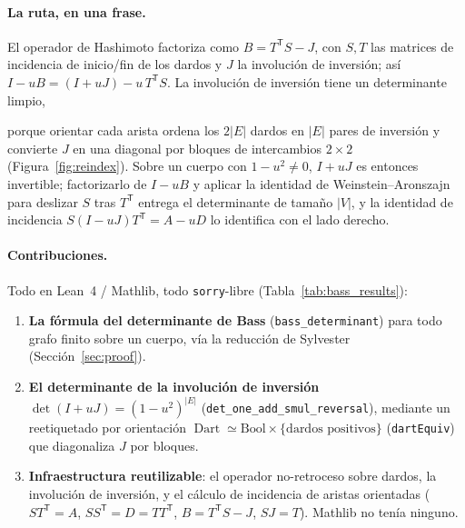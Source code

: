 \documentclass[11pt]{article}
\newcommand{\lean}[1]{\texttt{#1}}
\DeclareMathOperator{\Dart}{Dart}
\newcommand{\keyeq}[1]{\begin{center}\keybox{$\displaystyle #1$}\end{center}}
\begin{document}
\paragraph{La ruta, en una frase.}
El operador de Hashimoto factoriza como $B=T^{\mathsf T}S-J$, con $S,T$ las matrices de incidencia de
inicio/fin de los dardos y $J$ la involuci\'on de inversi\'on; as\'i $I-uB=(I+uJ)-u\,T^{\mathsf T}S$.
La involuci\'on de inversi\'on tiene un determinante limpio,
\keyeq{\det(I+uJ)\;=\;(1-u^2)^{|E|},}
porque orientar cada arista ordena los $2|E|$ dardos en $|E|$ pares de inversi\'on y convierte $J$ en
una diagonal por bloques de intercambios $2\times2$ (Figura~\ref{fig:reindex}). Sobre un cuerpo con
$1-u^2\neq0$, $I+uJ$ es entonces invertible; factorizarlo de $I-uB$ y aplicar la identidad de
Weinstein--Aronszajn para deslizar $S$ tras $T^{\mathsf T}$ entrega el determinante de tama\~no $|V|$,
y la identidad de incidencia $S(I-uJ)T^{\mathsf T}=A-uD$ lo identifica con el lado derecho.

\paragraph{Contribuciones.} Todo en Lean~4 / Mathlib, todo \lean{sorry}-libre
(Tabla~\ref{tab:bass_results}):
\begin{enumerate}\itemsep2pt
\item \textbf{La f\'ormula del determinante de Bass} (\lean{bass\_determinant}) para todo grafo
  finito sobre un cuerpo, v\'ia la reducci\'on de Sylvester (Secci\'on~\ref{sec:proof}).
\item \textbf{El determinante de la involuci\'on de inversi\'on} $\det(I+uJ)=(1-u^2)^{|E|}$
  (\lean{det\_one\_add\_smul\_reversal}), mediante un reetiquetado por orientaci\'on
  $\Dart\simeq\mathrm{Bool}\times\{\text{dardos positivos}\}$ (\lean{dartEquiv}) que diagonaliza $J$
  por bloques.
\item \textbf{Infraestructura reutilizable}: el operador no-retroceso sobre dardos, la involuci\'on
  de inversi\'on, y el c\'alculo de incidencia de aristas orientadas
  ($S T^{\mathsf T}=A$, $S S^{\mathsf T}=D=T T^{\mathsf T}$, $B=T^{\mathsf T}S-J$, $SJ=T$). Mathlib no
  ten\'ia ninguno.
\end{enumerate}
\end{document}
